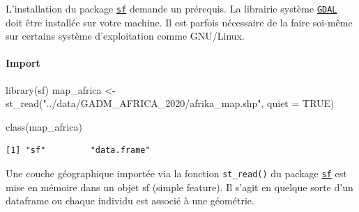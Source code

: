 \documentclass[
  letterpaper,
  DIV=11,
  numbers=noendperiod]{scrartcl}
\let\oldparagraph\paragraph
\renewcommand{\paragraph}[1]{\oldparagraph{#1}\mbox{}}
\newenvironment{Shaded}{\begin{snugshade}}{\end{snugshade}}
\newcommand{\AttributeTok}[1]{\textcolor[rgb]{0.40,0.45,0.13}{#1}}
\newcommand{\ConstantTok}[1]{\textcolor[rgb]{0.56,0.35,0.01}{#1}}
\newcommand{\FunctionTok}[1]{\textcolor[rgb]{0.28,0.35,0.67}{#1}}
\newcommand{\NormalTok}[1]{\textcolor[rgb]{0.00,0.23,0.31}{#1}}
\newcommand{\OtherTok}[1]{\textcolor[rgb]{0.00,0.23,0.31}{#1}}
\newcommand{\StringTok}[1]{\textcolor[rgb]{0.13,0.47,0.30}{#1}}
\begin{document}
\begin{tcolorbox}[enhanced jigsaw, colframe=quarto-callout-note-color-frame, bottomtitle=1mm, colback=white, leftrule=.75mm, breakable, left=2mm, titlerule=0mm, toptitle=1mm, arc=.35mm, title=\textcolor{quarto-callout-note-color}{\faInfo}\hspace{0.5em}{Note}, rightrule=.15mm, bottomrule=.15mm, toprule=.15mm, colbacktitle=quarto-callout-note-color!10!white, opacitybacktitle=0.6, opacityback=0, coltitle=black]

L'installation du package
\href{https://r-spatial.github.io/sf/}{\texttt{sf}} demande un
prérequis. La librairie système \href{https://gdal.org/}{\texttt{GDAL}}
doit être installée sur votre machine. Il est parfois nécessaire de la
faire soi-même sur certains système d'exploitation comme GNU/Linux.

\end{tcolorbox}

\hypertarget{import-2}{%
\paragraph{Import}\label{import-2}}

\begin{Shaded}
\begin{Highlighting}[]
\FunctionTok{library}\NormalTok{(sf)}
\NormalTok{map\_africa }\OtherTok{\textless{}{-}} \FunctionTok{st\_read}\NormalTok{(}\StringTok{"../data/GADM\_AFRICA\_2020/afrika\_map.shp"}\NormalTok{,  }\AttributeTok{quiet =} \ConstantTok{TRUE}\NormalTok{)}

\FunctionTok{class}\NormalTok{(map\_africa)}
\end{Highlighting}
\end{Shaded}

\begin{verbatim}
[1] "sf"         "data.frame"
\end{verbatim}

\begin{tcolorbox}[enhanced jigsaw, colframe=quarto-callout-important-color-frame, bottomtitle=1mm, colback=white, leftrule=.75mm, breakable, left=2mm, titlerule=0mm, toptitle=1mm, arc=.35mm, title=\textcolor{quarto-callout-important-color}{\faExclamation}\hspace{0.5em}{Important}, rightrule=.15mm, bottomrule=.15mm, toprule=.15mm, colbacktitle=quarto-callout-important-color!10!white, opacitybacktitle=0.6, opacityback=0, coltitle=black]

Une couche géographique importée via la fonction \texttt{st\_read()} du
package \href{https://r-spatial.github.io/sf/}{\texttt{sf}} est mise en
mémoire dans un objet sf (simple feature). Il s'agit en quelque sorte
d'un dataframe ou chaque individu est associé à une géométrie.

\end{tcolorbox}
\end{document}

